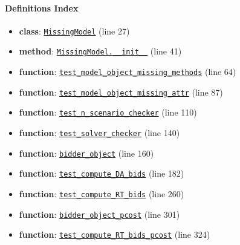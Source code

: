\documentclass[11pt]{report}
\begin{document}
\paragraph{Definitions Index}
\begin{itemize}[leftmargin=*]
  \item \textbf{class}: \hyperref[def:tests-test_bidder.py:MissingModel:L27]{\texttt{MissingModel}} (line 27)
  \item \textbf{method}: \hyperref[def:tests-test_bidder.py:MissingModel.__init__:L41]{\texttt{MissingModel.\_\_init\_\_}} (line 41)
  \item \textbf{function}: \hyperref[def:tests-test_bidder.py:test_model_object_missing_methods:L64]{\texttt{test\_model\_object\_missing\_methods}} (line 64)
  \item \textbf{function}: \hyperref[def:tests-test_bidder.py:test_model_object_missing_attr:L87]{\texttt{test\_model\_object\_missing\_attr}} (line 87)
  \item \textbf{function}: \hyperref[def:tests-test_bidder.py:test_n_scenario_checker:L110]{\texttt{test\_n\_scenario\_checker}} (line 110)
  \item \textbf{function}: \hyperref[def:tests-test_bidder.py:test_solver_checker:L140]{\texttt{test\_solver\_checker}} (line 140)
  \item \textbf{function}: \hyperref[def:tests-test_bidder.py:bidder_object:L160]{\texttt{bidder\_object}} (line 160)
  \item \textbf{function}: \hyperref[def:tests-test_bidder.py:test_compute_DA_bids:L182]{\texttt{test\_compute\_DA\_bids}} (line 182)
  \item \textbf{function}: \hyperref[def:tests-test_bidder.py:test_compute_RT_bids:L260]{\texttt{test\_compute\_RT\_bids}} (line 260)
  \item \textbf{function}: \hyperref[def:tests-test_bidder.py:bidder_object_pcost:L301]{\texttt{bidder\_object\_pcost}} (line 301)
  \item \textbf{function}: \hyperref[def:tests-test_bidder.py:test_compute_RT_bids_pcost:L324]{\texttt{test\_compute\_RT\_bids\_pcost}} (line 324)
\end{itemize}
\end{document}
